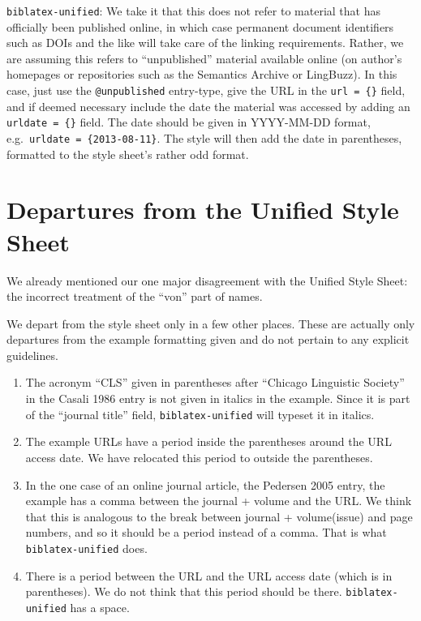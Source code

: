 \documentclass[
]{article}
\providecommand{\tightlist}{%
  \setlength{\itemsep}{0pt}\setlength{\parskip}{0pt}}
\begin{document}
\texttt{biblatex-unified}: We take it that this does not refer to
material that has officially been published online, in which case
permanent document identifiers such as DOIs and the like will take care
of the linking requirements. Rather, we are assuming this refers to
``unpublished'' material available online (on author's homepages or
repositories such as the Semantics Archive or LingBuzz). In this case,
just use the \texttt{@unpublished} entry-type, give the URL in the
\texttt{url\ =\ \{\}} field, and if deemed necessary include the date
the material was accessed by adding an \texttt{urldate\ =\ \{\}} field.
The date should be given in YYYY-MM-DD format,
e.g.~\texttt{urldate\ =\ \{2013-08-11\}}. The style will then add the
date in parentheses, formatted to the style sheet's rather odd format.

\hypertarget{departures-from-the-unified-style-sheet}{%
\section{Departures from the Unified Style
Sheet}\label{departures-from-the-unified-style-sheet}}

We already mentioned our one major disagreement with the Unified Style
Sheet: the incorrect treatment of the ``von'' part of names.

We depart from the style sheet only in a few other places. These are
actually only departures from the example formatting given and do not
pertain to any explicit guidelines.

\begin{enumerate}
\def\labelenumi{\arabic{enumi}.}
\tightlist
\item
  The acronym ``CLS'' given in parentheses after ``Chicago Linguistic
  Society'' in the Casali 1986 entry is not given in italics in the
  example. Since it is part of the ``journal title'' field,
  \texttt{biblatex-unified} will typeset it in italics.
\item
  The example URLs have a period inside the parentheses around the URL
  access date. We have relocated this period to outside the parentheses.
\item
  In the one case of an online journal article, the Pedersen 2005 entry,
  the example has a comma between the journal + volume and the URL. We
  think that this is analogous to the break between journal +
  volume(issue) and page numbers, and so it should be a period instead
  of a comma. That is what \texttt{biblatex-unified} does.
\item
  There is a period between the URL and the URL access date (which is in
  parentheses). We do not think that this period should be there.
  \texttt{biblatex-unified} has a space.
\end{enumerate}
\end{document}
